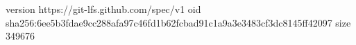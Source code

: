 version https://git-lfs.github.com/spec/v1
oid sha256:6ee5b3fdae9cc288afa97c46fd1b62fcbad91c1a9a3e3483cf3dc8145ff42097
size 349676
